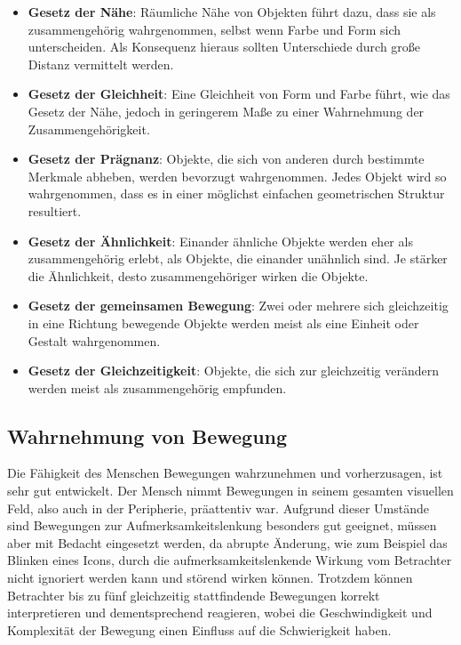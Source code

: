 \begin{itemize}
    \item \textbf{Gesetz der Nähe}: Räumliche Nähe von Objekten führt dazu, dass sie als zusammengehörig wahrgenommen, selbst wenn Farbe und Form sich unterscheiden. Als Konsequenz hieraus sollten Unterschiede durch große Distanz vermittelt werden. \cite[S. 56]{2010.Preim}
    \item \textbf{Gesetz der Gleichheit}: Eine Gleichheit von Form und Farbe führt, wie das Gesetz der Nähe, jedoch in geringerem Maße zu einer Wahrnehmung der Zusammengehörigkeit. \cite[S. 56]{2010.Preim}
    \item \textbf{Gesetz der Prägnanz}: Objekte, die sich von anderen durch bestimmte Merkmale abheben, werden bevorzugt wahrgenommen. Jedes Objekt wird so wahrgenommen, dass es in einer möglichst einfachen geometrischen Struktur resultiert. \cite{Gestaltgesetze}
    \item \textbf{Gesetz der Ähnlichkeit}: Einander ähnliche Objekte werden eher als zusammengehörig erlebt, als Objekte, die einander unähnlich sind. Je stärker die Ähnlichkeit, desto zusammengehöriger wirken die Objekte. \cite{Gestaltgesetze}
    \item \textbf{Gesetz der gemeinsamen Bewegung}: Zwei oder mehrere sich gleichzeitig in eine Richtung bewegende Objekte werden meist als eine Einheit oder Gestalt wahrgenommen. \cite{Gestaltgesetze}
    \item \textbf{Gesetz der Gleichzeitigkeit}: Objekte, die sich zur gleichzeitig verändern werden meist als zusammengehörig empfunden. \cite{Gestaltgesetze}
\end{itemize}

\subsection{Wahrnehmung von Bewegung}

Die Fähigkeit des Menschen Bewegungen wahrzunehmen und vorherzusagen, ist sehr gut entwickelt. Der Mensch nimmt Bewegungen in seinem gesamten visuellen Feld, also auch in der Peripherie, präattentiv war. Aufgrund dieser Umstände sind Bewegungen zur Aufmerksamkeitslenkung besonders gut geeignet, müssen aber mit Bedacht eingesetzt werden, da abrupte Änderung, wie zum Beispiel das Blinken eines Icons, durch die aufmerksamkeitslenkende Wirkung vom Betrachter nicht ignoriert werden kann und störend wirken können. Trotzdem können Betrachter bis zu fünf gleichzeitig stattfindende Bewegungen korrekt interpretieren und dementsprechend reagieren, wobei die Geschwindigkeit und Komplexität der Bewegung einen Einfluss auf die Schwierigkeit haben. \cite[S. 60 f.]{2010.Preim}

